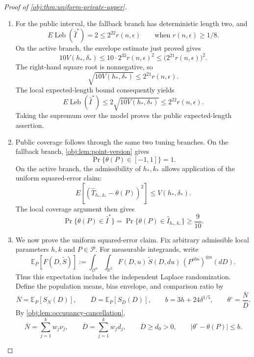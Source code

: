 \begin{proof}[Proof of \cref{obj:thm:uniform-private-upper}]
\begin{enumerate}
\item
For the public interval, the fallback branch has deterministic length two, and
\[
E\operatorname{Leb}(\widehat I^*)=2
\le2^{22}r(n,\epsilon)
\qquad\text{when }r(n,\epsilon)\ge1/8.
\]
On the active branch, the envelope estimate just proved gives
\[
10V(h_*,\delta_*)
\le10\cdot2^{33}r(n,\epsilon)^2
\le\bigl(2^{21}r(n,\epsilon)\bigr)^2.
\]
The right-hand square root is nonnegative, so
\[
\sqrt{10V(h_*,\delta_*)}\le2^{21}r(n,\epsilon).
\]
The local expected-length bound consequently yields
\[
E\operatorname{Leb}(\widehat I^*)
\le2\sqrt{10V(h_*,\delta_*)}
\le2^{22}r(n,\epsilon).
\]
Taking the supremum over the model proves the public expected-length assertion.

\item
Public coverage follows through the same two tuning branches. On the fallback branch, \cref{obj:lem:point-version} gives
\[
\Pr\{\theta(P)\in[-1,1]\}=1.
\]
On the active branch, the admissibility of \(h_*,k_*\) allows application of the uniform squared-error claim:
\[
E[(\widehat T_{h_*,k_*}-\theta(P))^2]
\le V(h_*,\delta_*).
\]
The local coverage argument then gives
\[
\Pr\{\theta(P)\in\widehat I^*\}
=
\Pr\{\theta(P)\in\widehat I_{h_*,k_*}\}
\ge\frac9{10}.
\]

\item
We now prove the uniform squared-error claim. Fix arbitrary admissible local parameters \(h,k\) and \(P\in\mathcal P\). For measurable integrands, write
\[
\mathbb E_P[F(D,\widetilde S)]
:=
\int_{\mathcal O^n}\int_{\mathbb R^2}
F(D,u)\,\widetilde S(D,du)\,
(P^{\mathrm{obs}})^{\otimes n}(dD).
\]
Thus this expectation includes the independent Laplace randomization. Define the population means, bias envelope, and comparison ratio by
\[
\overline N=\mathbb E_P[S_N(D)],
\qquad
\overline D=\mathbb E_P[S_D(D)],
\qquad
b=3h+24\delta^{1/5},
\qquad
\theta^\circ=\frac{\overline N}{\overline D}.
\]
By \cref{obj:lem:occupancy-cancellation},
\[
\overline N=\sum_{j=1}^k w_j\nu_j,
\qquad
\overline D=\sum_{j=1}^k w_jd_j,
\qquad
\overline D\ge d_0>0,
\qquad
|\theta^\circ-\theta(P)|\le b.
\]


\end{enumerate}
\end{proof}
